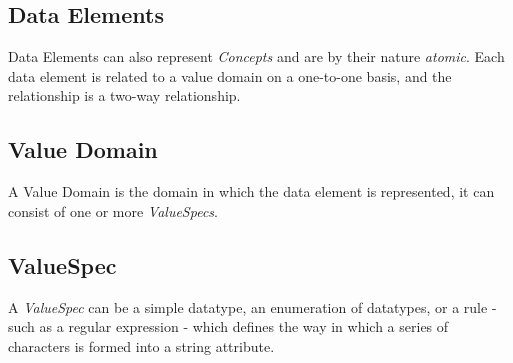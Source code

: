 \subsection{Data Elements} 
Data Elements can also represent \emph{Concepts} and are by their nature \emph{atomic}.  Each data element is related to a value domain on a one-to-one basis, and the relationship is a two-way relationship.
\subsection{Value Domain}
A Value Domain is the domain in which the data element is represented, it can consist of one or more \emph{ValueSpecs}.
\subsection{ValueSpec}
A \emph{ValueSpec} can be a simple datatype, an enumeration of datatypes, or a rule - such as a regular expression - which defines the way in which a series of characters is formed into a string attribute. 







 




